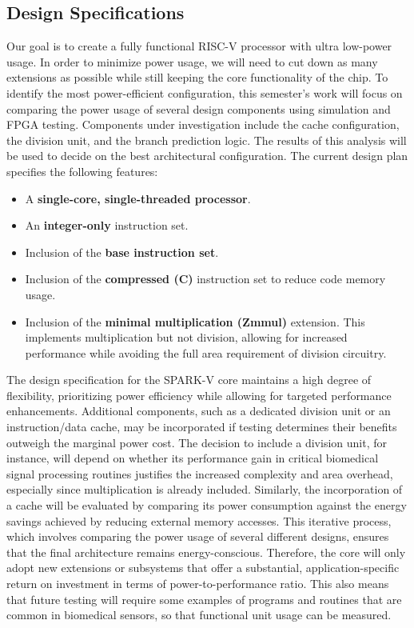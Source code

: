 \documentclass[conference]{IEEEtran}
\begin{document}
\subsection{Design Specifications}

Our goal is to create a fully functional RISC-V processor with ultra low-power usage. In order to minimize power usage, we will need to cut down as many extensions as possible while still keeping the core functionality of the chip. To identify the most power-efficient configuration, this semester's work will focus on comparing the power usage of several design components using simulation and FPGA testing. Components under investigation include the cache configuration, the division unit, and the branch prediction logic. The results of this analysis will be used to decide on the best architectural configuration. The current design plan specifies the following features:


\begin{itemize}
    \item A \textbf{single-core, single-threaded processor}.
    \item An \textbf{integer-only} instruction set.
    \item Inclusion of the \textbf{base instruction set}.
    \item Inclusion of the \textbf{compressed (C)} instruction set to reduce code memory usage.
    \item Inclusion of the \textbf{minimal multiplication (Zmmul)} extension. This implements multiplication but not division, allowing for increased performance while avoiding the full area requirement of division circuitry.
\end{itemize}

The design specification for the SPARK-V core maintains a high degree of flexibility, prioritizing power efficiency while allowing for targeted performance enhancements. Additional components, such as a dedicated division unit or an instruction/data cache, may be incorporated if testing determines their benefits outweigh the marginal power cost. The decision to include a division unit, for instance, will depend on whether its performance gain in critical biomedical signal processing routines justifies the increased complexity and area overhead, especially since multiplication is already included. Similarly, the incorporation of a cache will be evaluated by comparing its power consumption against the energy savings achieved by reducing external memory accesses. This iterative process, which involves comparing the power usage of several different designs, ensures that the final architecture remains energy-conscious. Therefore, the core will only adopt new extensions or subsystems that offer a substantial, application-specific return on investment in terms of power-to-performance ratio. This also means that future testing will require some examples of programs and routines that are common in biomedical sensors, so that functional unit usage can be measured.
\end{document}

